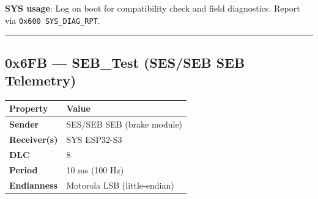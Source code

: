\documentclass[12pt,a4paper,oneside]{report}
\begin{document}
\textbf{SYS usage}: Log on boot for compatibility check and field diagnostics.
Report via \texttt{0x600\ SYS\_DIAG\_RPT}.

\begin{center}\rule{0.5\linewidth}{0.5pt}\end{center}

\subsection{0x6FB --- SEB\_Test (SES/SEB SEB
Telemetry)}\label{x6fb-seb_test-SES/SEB-seb-telemetry}

\begin{longtable}[]{@{}ll@{}}
\toprule\noalign{}
Property & Value \\
\midrule\noalign{}
\endhead
\bottomrule\noalign{}
\endlastfoot
\textbf{Sender} & SES/SEB SEB (brake module) \\
\textbf{Receiver(s)} & SYS ESP32-S3 \\
\textbf{DLC} & 8 \\
\textbf{Period} & 10 ms (100 Hz) \\
\textbf{Endianness} & Motorola LSB (little-endian) \\
\end{longtable}
\end{document}
